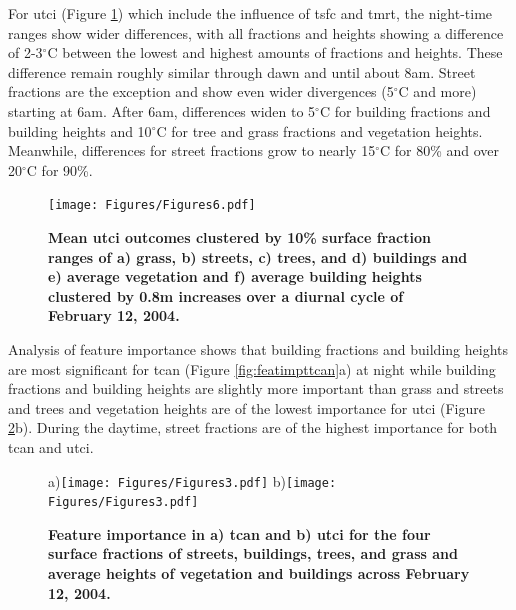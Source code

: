 \documentclass[final,3p,times,authoryear]{elsarticle}
\begin{document}
For \gls{utci} (Figure \ref{fig:utciday}) which include the influence of \gls{tsfc} and \gls{tmrt}, the night-time ranges show wider differences, with all fractions and heights showing a difference of 2-3$^{\circ}$C between the lowest and highest amounts of fractions and heights. These difference remain roughly similar through dawn and until about 8am. Street fractions are the exception and show even wider divergences (5$^{\circ}$C and more) starting at 6am. After 6am, differences widen to 5$^{\circ}$C for building fractions and building heights and 10$^{\circ}$C for tree and grass fractions and vegetation heights. Meanwhile, differences for street fractions grow to nearly 15$^{\circ}$C for 80\% and over 20$^{\circ}$C for 90\%.








\begin{figure}
\centering
\texttt{[image: Figures/Figures6.pdf]}
\caption{\bf Mean \gls{utci} outcomes clustered by 10\% surface fraction ranges of a) grass, b) streets, c) trees, and d) buildings and e) average vegetation and f) average building heights clustered by 0.8m increases over a diurnal cycle of February 12, 2004. }
 \label{fig:utciday}
\end{figure}


Analysis of feature importance shows that building fractions and building heights are most significant for \gls{tcan} (Figure \ref{fig:featimpttcan}a) at night while building fractions and building heights are slightly more important than grass and streets and trees and vegetation heights are of the lowest importance for \gls{utci} (Figure  \ref{fig:featimptutci}b). During the daytime, street fractions are of the highest importance for both \gls{tcan} and \gls{utci}.


\begin{figure}
\centering
{\tiny a)}\texttt{[image: Figures/Figures3.pdf]}
{\tiny b)}\texttt{[image: Figures/Figures3.pdf]}\\
\caption{\bf Feature importance in a) \gls{tcan} and b) \gls{utci} for the four surface fractions of streets, buildings, trees, and grass and average heights of vegetation and buildings across February 12, 2004.}
\label{fig:featimpttcan}
\label{fig:featimptutci}
\end{figure}
\end{document}
